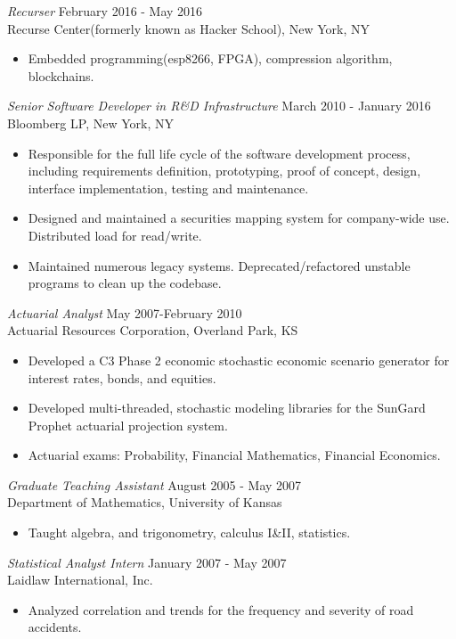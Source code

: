 \documentclass[margin]{res}
\begin{document}
\begin{resume}
		{\sl Recurser} \hfill February  2016 - May 2016\\
		Recurse Center(formerly known as Hacker School),
                New York, NY
 \begin{itemize}  
	       \item Embedded programming(esp8266, FPGA), compression algorithm, blockchains.
\end {itemize}
		{\sl Senior Software Developer in R\&D Infrastructure} \hfill March 2010 - January 2016\\
                Bloomberg LP,
                New York, NY 
                 \begin{itemize}  
		 \item Responsible for the full life cycle of the software development process, including requirements definition, prototyping, proof of concept, design, interface implementation, testing and maintenance.
                 \item Designed and maintained a securities mapping system for company-wide use. Distributed load for read/write.
		 \item Maintained numerous legacy systems. Deprecated/refactored unstable programs to clean up the codebase.
		 \end {itemize}
		{\sl Actuarial Analyst} \hfill May 2007-February 2010\\
                Actuarial Resources Corporation,
                Overland Park, KS
                 \begin{itemize} 
                 \item Developed a C3 Phase 2 economic stochastic economic scenario generator for
                   interest rates, bonds, and equities.
                 \item Developed multi-threaded, stochastic modeling libraries for the SunGard Prophet actuarial projection system.
                 \item Actuarial exams: Probability, Financial Mathematics, Financial Economics.
                 \end{itemize}
                {\sl Graduate Teaching Assistant} \hfill            August 2005 - May 2007\\
                Department of Mathematics, University of Kansas 
                 \begin{itemize}
                 \item Taught algebra, and trigonometry, calculus I\&II, statistics.
                 \end{itemize} 
                {\sl Statistical Analyst Intern} \hfill             January 2007 - May 2007\\
                Laidlaw International, Inc.
                 \begin{itemize}  \itemsep -2pt %
                 \item Analyzed correlation and trends for the frequency and severity of road accidents.
                 \end{itemize} 

\end{resume}
\end{document}
